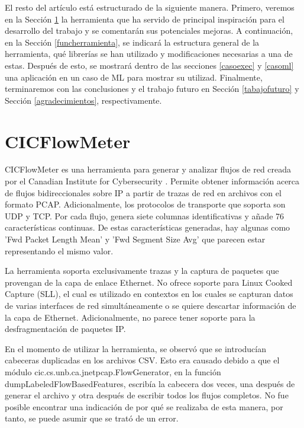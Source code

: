 \documentclass[10pt,a4paper,twoside]{article}
\begin{document}
\begin{multicols*}{2}
    El resto del artículo está estructurado de la siguiente manera. Primero, veremos en la Sección \ref{cicflowmeter} la herramienta que ha servido de principal inspiración para el desarrollo del trabajo y se comentarán sus potenciales mejoras. A continuación, en la Sección \ref{funcherramienta}, se indicará la estructura general de la herramienta, qué librerías se han utilizado y modificaciones necesarias a una de estas. Después de esto, se mostrará dentro de las secciones \ref{casoexec} y \ref{casoml} una aplicación en un caso de ML para mostrar su utilizad. Finalmente, terminaremos con las conclusiones y el trabajo futuro en Sección \ref{tabajofuturo} y Sección \ref{agradecimientos}, respectivamente.

    \section{CICFlowMeter} \label{cicflowmeter}

    CICFlowMeter es una herramienta para generar y analizar flujos de red creada por el Canadian Institute for Cybersecurity \cite{cicflowpost} \cite{icissp17} \cite{cicflowrepo}. Permite obtener información acerca de flujos bidireccionales sobre IP a partir de trazas de red en archivos con el formato PCAP. Adicionalmente, los protocolos de transporte que soporta son UDP y TCP. Por cada flujo, genera siete columnas identificativas y añade 76 características continuas. De estas características generadas, hay algunas como 'Fwd Packet Length Mean' y 'Fwd Segment Size Avg' que parecen estar representando el mismo valor.

    La herramienta soporta exclusivamente trazas y la captura de paquetes que provengan de la capa de enlace Ethernet. No ofrece soporte para Linux Cooked Capture (SLL), el cual es utilizado en contextos en los cuales se capturan datos de varias interfaces de red simultáneamente o se quiere descartar información de la capa de Ethernet. Adicionalmente, no parece tener soporte para la desfragmentación de paquetes IP.

    En el momento de utilizar la herramienta, se observó que se introducían cabeceras duplicadas en los archivos CSV. Esto era causado debido a que el módulo cic.cs.unb.ca.jnetpcap.FlowGenerator, en la función dumpLabeledFlowBasedFeatures, escribía la cabecera dos veces, una después de generar el archivo y otra después de escribir todos los flujos completos. No fue posible encontrar una indicación de por qué se realizaba de esta manera, por tanto, se puede asumir que se trató de un error.


\end{multicols*}
\end{document}
